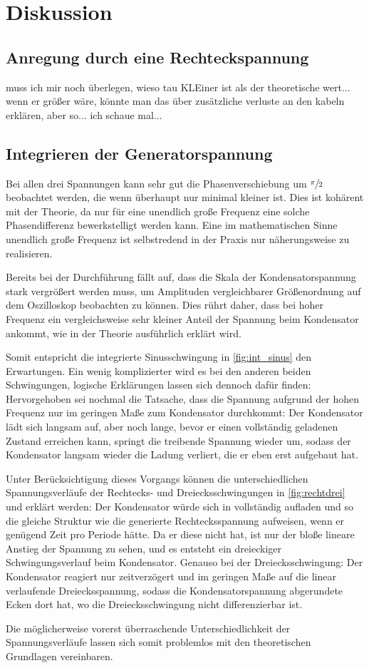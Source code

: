 \section{Diskussion}
\label{sec:Diskussion}

\subsection{Anregung durch eine Rechteckspannung}

muss ich mir noch überlegen, wieso tau KLEiner ist als der theoretische wert... wenn er größer wäre, könnte man das über 
zusätzliche verluste an den kabeln erklären, aber so... ich schaue mal... 

\subsection{Integrieren der Generatorspannung}

Bei allen drei Spannungen kann sehr gut die Phasenverschiebung um $\sfrac{\pi}{2}$ beobachtet werden, die wenn überhaupt 
nur minimal kleiner ist. 
Dies ist kohärent mit der Theorie, da nur für eine unendlich große Frequenz eine solche Phasendifferenz bewerkstelligt 
werden kann. Eine im mathematischen Sinne unendlich große Frequenz ist selbstredend in der Praxis nur näherungsweise zu 
realisieren. 

Bereits bei der Durchführung fällt auf, dass die Skala der Kondensatorspannung stark vergrößert werden muss, um Amplituden 
vergleichbarer Größenordnung auf dem Oszilloskop beobachten zu können. 
Dies rührt daher, dass bei hoher Frequenz ein vergleichsweise sehr kleiner Anteil der Spannung beim Kondensator ankommt, 
wie in der Theorie ausführlich erklärt wird. 

Somit entspricht die integrierte Sinusschwingung in \ref{fig:int_sinus} den Erwartungen.
Ein wenig komplizierter wird es bei den anderen beiden Schwingungen, logische Erklärungen lassen sich dennoch dafür finden: 
Hervorgehoben sei nochmal die Tatsache, dass die Spannung aufgrund der hohen Frequenz nur im geringen Maße zum Kondensator 
durchkommt: Der Kondensator lädt sich langsam auf, aber noch lange, bevor er einen vollständig geladenen Zustand erreichen 
kann, springt die treibende Spannung wieder um, sodass der Kondensator langsam wieder die Ladung verliert, die er 
eben erst aufgebaut hat. 

Unter Berücksichtigung dieses Vorgangs können die unterschiedlichen Spannungsverläufe der Rechtecks- und Dreiecksschwingungen 
in \ref{fig:rechtdrei}  und  erklärt werden:
Der Kondensator würde sich in  vollständig aufladen und so die gleiche Struktur wie die generierte 
Rechtecksspannung aufweisen, wenn er genügend Zeit pro Periode hätte. Da er diese nicht hat, ist nur der bloße lineare
Anstieg der Spannung zu sehen, und es entsteht ein dreieckiger Schwingungsverlauf beim Kondensator. 
Genauso bei der Dreiecksschwingung: Der Kondensator reagiert nur zeitverzögert und im geringen Maße auf die linear verlaufende 
Dreiecksspannung, sodass die Kondensatorspannung \glqq abgerundete Ecken \grqq{} dort hat, wo die Dreiecksschwingung nicht 
differenzierbar ist. 

Die möglicherweise vorerst überraschende Unterschiedlichkeit der Spannungsverläufe lassen sich somit problemlos mit den 
theoretischen Grundlagen vereinbaren. 
